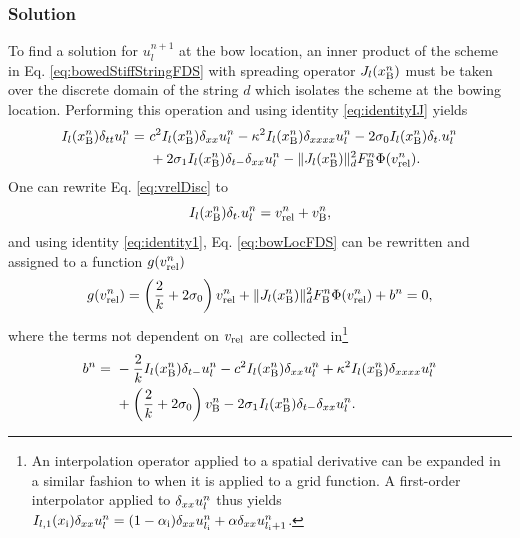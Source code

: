 \subsubsection{Solution}
To find a solution for $u_l^{n+1}$ at the bow location, an inner product of the scheme in Eq. \eqref{eq:bowedStiffStringFDS} with spreading operator $J_l(x_{\text{B}}^n)$ must be taken over the discrete domain of the string $d$ which isolates the scheme at the bowing location. Performing this operation and using identity \eqref{eq:identityIJ} yields
\begin{equation}\label{eq:bowLocFDS}
    \begin{aligned}
    I_l(x_{\text{B}}^n)\delta_{tt}u_l^n =\ &c^2 I_l(x_{\text{B}}^n)\delta_{xx} u_l^n - \kappa^2 I_l(x_{\text{B}}^n)\delta_{xxxx} u_l^n- 2 \sigma_{0} I_l(x_{\text{B}}^n)\delta_{t\cdot} u_l^n\\
    & + 2 \sigma_{1} I_l(x_{\text{B}}^n)\delta_{t-}\delta_{xx} u_l^n - \lVert J_l(x_{\text{B}}^n)\rVert^2_d F_{\text{B}}^n\Phi(v_\text{rel}^n).
    \end{aligned}
\end{equation}
One can rewrite Eq. \eqref{eq:vrelDisc} to 
\begin{equation}\label{eq:vrelRewritten}
   I_l(x_{\text{B}}^n)\delta_{t\cdot} u_l^n =  v_\text{rel}^n + v_{\text{B}}^n,
\end{equation}
and using identity \eqref{eq:identity1}, Eq. \eqref{eq:bowLocFDS} can be rewritten and assigned to a function $g(v_\text{rel}^n)$ 
\begin{equation}\label{eq:staticFrictionNRfunc}
    g(v_\text{rel}^n) = \left(\frac{2}{k} + 2\sigma_{0}\right)v_\text{rel}^n + \lVert J_l(x_{\text{B}}^n)\rVert^2_d F_{\text{B}}^n\Phi(v_\text{rel}^n) + b^n = 0,
\end{equation}
where the terms not dependent on $v_\text{rel}$ are collected in\footnote{An interpolation operator applied to a spatial derivative can be expanded in a similar fashion to when it is applied to a grid function. A first-order interpolator applied to $\delta_{xx} u_l^n$ thus yields $I_{l,1}(x_{\text{i}}) \delta_{xx} u_l^n = (1-\alpha_{\text{i}})\delta_{xx} u_{l_{\text{i}}}^n + \alpha \delta_{xx} u_{l_{\text{i}}+1}^n$.}
\begin{equation}\label{eq:staticbDef}
    \begin{aligned}
        b^n =\ &-\frac{2}{k}I_l(x_{\text{B}}^n)\delta_{t-} u_l^n-c^2 I_l(x_{\text{B}}^n)\delta_{xx} u_l^n + \kappa^2 I_l(x_{\text{B}}^n)\delta_{xxxx} u_l^n \\
        &+ \left( \frac{2}{k} + 2 \sigma_{0} \right)v_{\text{B}}^n - 2 \sigma_{1} I_l(x_{\text{B}}^n)\delta_{t-}\delta_{xx} u_l^n.
    \end{aligned}
\end{equation}
%

